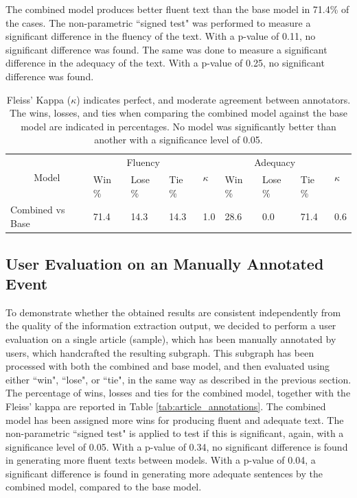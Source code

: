 \documentclass[
hf, %
]{ceurart}
\begin{document}
The combined model produces better fluent text than the base model in 71.4\% of the cases. The non-parametric ``signed test" was performed to measure a significant difference in the fluency of the text. With a p-value of 0.11, no significant difference was found. The same was done to measure a significant difference in the adequacy of the text. With a p-value of 0.25, no significant difference was found.

\begin{table}[ht]
\caption{Fleiss' Kappa ($\kappa$) indicates perfect, and moderate agreement between annotators. The wins, losses, and ties when comparing the combined model against the base model are indicated in percentages. No model was significantly better than another with a significance level of 0.05.}

\centering
\begin{tabular}{|c|lll|l|lll|l|}
\hline
\multirow{2}{*}{Model}                 & \multicolumn{3}{c|}{Fluency}                                     & \multirow{2}{*}{$\kappa$} & \multicolumn{3}{c|}{Adequacy}                                    & \multirow{2}{*}{$\kappa$} \\ \cline{2-4} \cline{6-8}
                                       & \multicolumn{1}{l|}{Win \%} & \multicolumn{1}{l|}{Lose \%} & Tie \% &                    & \multicolumn{1}{l|}{Win \%} & \multicolumn{1}{l|}{Lose \%} & Tie \% &                    \\ \hline
\multicolumn{1}{|l|}{Combined vs Base} & \multicolumn{1}{l|}{71.4}  & \multicolumn{1}{l|}{14.3}   & 14.3  & 1.0                & \multicolumn{1}{l|}{28.6}  & \multicolumn{1}{l|}{0.0}    & 71.4  & 0.6                \\ \hline
\end{tabular}
\label{tab:event_annotations}
\end{table}

\subsection{User Evaluation on an Manually Annotated Event}
\label{sec:result_gen_event}
To demonstrate whether the obtained results are consistent independently from the quality of the information extraction output, we decided to perform a user evaluation on a single article (sample), which has been manually annotated by users, which handcrafted the resulting subgraph. This subgraph has been processed with both the combined and base model, and then evaluated using either ``win", ``lose", or ``tie", in the same way as described in the previous section. The percentage of wins, losses and ties for the combined model, together with the Fleiss' kappa are reported in Table \ref{tab:article_annotations}. The combined model has been assigned more wins for producing fluent and adequate text. The non-parametric ``signed test" is applied to test if this is significant, again, with a significance level of 0.05. With a p-value of 0.34, no significant difference is found in generating more fluent texts between models. With a p-value of 0.04, a significant difference is found in generating more adequate sentences by the combined model, compared to the base model.
\end{document}
